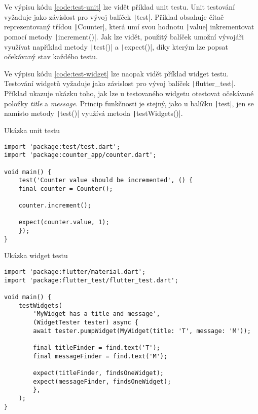 Ve výpisu kódu \ref{code:test-unit} lze vidět příklad unit testu.
\cite{testing_flutter_unit}
Unit testování vyžaduje jako závislost pro vývoj balíček
\texttt|test|.
Příklad obsahuje čítač reprezentovaný třídou \texttt|Counter|,
která umí svou hodnotu \texttt|value| inkrementovat pomocí
metody \texttt|increment()|.
Jak lze vidět,
použitý balíček umožní vývojáři využívat například metody
\texttt|test()| a \texttt|expect()|,
díky kterým lze popsat očekávaný stav každého testu.

Ve výpisu kódu \ref{code:test-widget} lze naopak vidět příklad widget testu.
\cite{testing_flutter_widget}
Testování widgetů vyžaduje jako závislost pro vývoj balíček
\texttt|flutter_test|.
Příklad ukazuje ukázku toho,
jak lze u testovaného widgetu otestovat očekávané položky \emph{title}
a \emph{message}.
Princip funkčnosti je stejný,
jako u balíčku \texttt|test|,
jen se namísto metody \texttt|test()|
využívá metoda \texttt|testWidgets()|.

\begin{listing}
    \caption{Ukázka unit testu \cite{testing_flutter_unit}}
    \label{code:test-unit}
    \begin{verbatim}
import 'package:test/test.dart';
import 'package:counter_app/counter.dart';

void main() {
    test('Counter value should be incremented', () {
    final counter = Counter();

    counter.increment();

    expect(counter.value, 1);
    });
}
    \end{verbatim}
\end{listing}

\begin{listing}
    \caption{Ukázka widget testu \cite{testing_flutter_widget}}
    \label{code:test-widget}
    \begin{verbatim}
import 'package:flutter/material.dart';
import 'package:flutter_test/flutter_test.dart';

void main() {
    testWidgets(
        'MyWidget has a title and message',
        (WidgetTester tester) async {
        await tester.pumpWidget(MyWidget(title: 'T', message: 'M'));

        final titleFinder = find.text('T');
        final messageFinder = find.text('M');

        expect(titleFinder, findsOneWidget);
        expect(messageFinder, findsOneWidget);
        },
    );
}
    \end{verbatim}
\end{listing}

